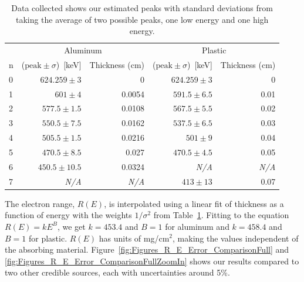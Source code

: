 \begin{table}
	[tbp] 
	\begin{center}
		\begin{tabular}{lrrrr}
\toprule
 	 &  		\multicolumn{2}{c}{Aluminum} 			 & 			\multicolumn{2}{c}{Plastic} 				\\
\cmidrule(r){2-3}
\cmidrule(r){4-5}
n    & ($\text{peak}\pm\sigma$)~[keV] 	& Thickness (cm) & ($\text{peak}\pm\sigma$)~[keV] 	& Thickness (cm) 	\\
\midrule
0    & $624.259\pm3$					&	0	         &	$624.259\pm3$					&	0   			\\
1    & $601\pm4$						&	0.0054		 &	$591.5\pm6.5$					&	0.01			\\
2    & $577.5\pm1.5$					&	0.0108		 &	$567.5\pm5.5$					&	0.02			\\
3    & $550.5\pm7.5$					&	0.0162		 &	$537.5\pm6.5$					&	0.03			\\
4    & $505.5\pm1.5$					&	0.0216		 &	$501\pm9$						&	0.04			\\
5    & $470.5\pm8.5$					&	0.027	     &	$470.5\pm4.5$					&	0.05			\\
6    & $450.5\pm10.5$					&	0.0324		 &	\textit{N/A}					&	\textit{N/A}	\\
7    & 	\textit{N/A}	    			&	\textit{N/A} &	$413\pm13$						&	0.07  			\\
\bottomrule
		\end{tabular}
	\end{center}
	\caption{Data collected shows our estimated peaks with standard deviations from taking the average of two possible peaks, one low energy and one high energy.} \label{tab:dataCollected}
\end{table}%
The electron range, $R(E)$, is interpolated using a linear fit of thickness as a function of energy with the weights $1/\sigma^2$ from Table~\ref{tab:dataCollected}. Fitting to the equation $R(E)=kE^B$, we get $k=453.4$ and $B=1$ for aluminum and $k=458.4$ and $B=1$ for plastic. $R(E)$ has units of mg/cm$^2$, making the values independent of the absorbing material. Figure~\ref{fig:Figures_R_E_Error_ComparisonFull} and \ref{fig:Figures_R_E_Error_ComparisonFullZoomIn} shows our results compared to two other credible sources\cite{RevModPhys.24.28,nistData}, each with uncertainties around 5\%.  

